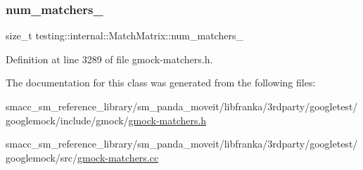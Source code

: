 \subsubsection{\texorpdfstring{num\+\_\+matchers\+\_\+}{num\_matchers\_}}
{\footnotesize\ttfamily size\+\_\+t testing\+::internal\+::\+Match\+Matrix\+::num\+\_\+matchers\+\_\+\hspace{0.3cm}{\ttfamily [private]}}



Definition at line 3289 of file gmock-\/matchers.\+h.



The documentation for this class was generated from the following files\+:\begin{DoxyCompactItemize}
\item 
smacc\+\_\+sm\+\_\+reference\+\_\+library/sm\+\_\+panda\+\_\+moveit/libfranka/3rdparty/googletest/googlemock/include/gmock/\hyperlink{gmock-matchers_8h}{gmock-\/matchers.\+h}\item 
smacc\+\_\+sm\+\_\+reference\+\_\+library/sm\+\_\+panda\+\_\+moveit/libfranka/3rdparty/googletest/googlemock/src/\hyperlink{gmock-matchers_8cc}{gmock-\/matchers.\+cc}\end{DoxyCompactItemize}
